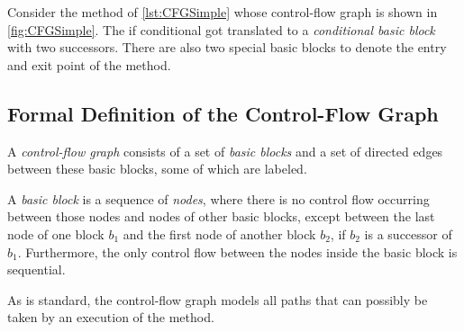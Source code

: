 Consider the method  of \autoref{lst:CFGSimple} whose control-flow
graph is shown in \autoref{fig:CFGSimple}. The if conditional got translated to
a \emph{conditional basic block} with two successors. There are also two
special basic blocks to denote the entry and exit point of the method.


\subsection{Formal Definition of the Control-Flow Graph}
\label{sec:cfg-formal}

\begin{definition}
    A \emph{control-flow graph} consists of a set of \emph{basic blocks} and
    a set of directed edges between these basic blocks, some of which are labeled.
\end{definition}

\begin{definition}
    A \emph{basic block} is a sequence of \emph{nodes}, where there is no
    control flow occurring between those nodes and nodes of other basic
    blocks, except between the last node of one block $b_1$ and the first node
    of another block $b_2$, if $b_2$ is a successor of $b_1$.
    Furthermore, the only control flow between the nodes inside
    the basic block is sequential.
    
    As is standard, the control-flow graph models all paths that can possibly be taken by
    an execution of the method.
\end{definition}



